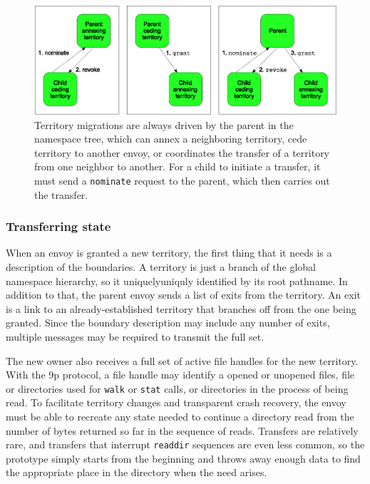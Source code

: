 \begin{figure}[tp]
\centering
\includegraphics[width=\figwidth]{figures/grant-topdown}
\caption[Types of territory migrations]{Territory migrations are always driven by the parent in the namespace tree, which can annex a neighboring territory, cede territory to another envoy, or coordinates the transfer of a territory from one neighbor to another. For a child to initiate a transfer, it must send a \texttt{nominate} request to the parent, which then carries out the transfer.}
\label{fig:grant-topdown}
\end{figure}

\subsubsection{Transferring state}\label{sec:migrating-state}

When an envoy is granted a new territory, the first thing that it needs is a description of the boundaries. A territory is just a branch of the global namespace hierarchy, so it uniquelyuniquly identified by its root pathname. In addition to that, the parent envoy sends a list of exits from the territory. An exit is a link to an already-established territory that branches off from the one being granted. Since the boundary description may include any number of exits, multiple messages may be required to transmit the full set.

The new owner also receives a full set of active file handles for the new territory. With the 9p protocol, a file handle may identify a opened or unopened files, file or directories used for \texttt{walk} or \texttt{stat} calls, or directories in the process of being read. To facilitate territory changes and transparent crash recovery, the envoy must be able to recreate any state needed to continue a directory read from the number of bytes returned so far in the sequence of reads. Transfers are relatively rare, and transfers that interrupt \texttt{readdir} sequences are even less common, so the prototype simply starts from the beginning and throws away enough data to find the appropriate place in the directory when the need arises.


